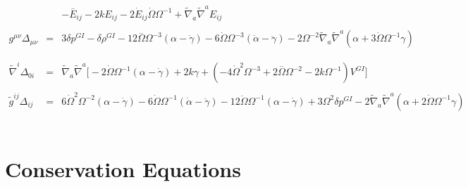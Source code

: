 \documentclass[10pt,letterpaper]{article}
\numberwithin{equation}{section}
\begin{document}
\begin{eqnarray}
\nonumber\\
&&- \overset{..}{E}_{ij} - 2 k E_{ij} - 2 \dot{E}_{ij} \dot{\Omega} \Omega^{-1} + \tilde{\nabla}_{a}\tilde{\nabla}^{a}E_{ij}
\\  \nonumber\\ 
g^{\mu\nu}\Delta_{\mu\nu}&=& 3 \delta p^{GI}{} -  \delta \rho^{GI}
-12 \overset{..}{\Omega}  \Omega^{-3}(\alpha - \dot\gamma) -6 \dot{\Omega} \Omega^{-3}(\dot{\alpha} -\ddot\gamma)
-2 \Omega^{-2} \tilde{\nabla}_{a}\tilde{\nabla}^{a}(\alpha +3\dot\Omega\Omega^{-1}\gamma)
\\ \nonumber\\
\nonumber\\ 
\tilde\nabla^i \Delta_{0i} &=& 
 \tilde\nabla_a\tilde\nabla^a\big[ -2 \dot{\Omega} \Omega^{-1} (\alpha - \dot\gamma) + 2 k \gamma 
+(-4 \dot{\Omega}^2 \Omega^{-3}  + 2 \overset{..}{\Omega} \Omega^{-2}  - 2 k \Omega^{-1}) V^{GI}\big]
\\ \nonumber\\
\tilde g^{ij}\Delta_{ij} &=&  6 \dot{\Omega}^2 \Omega^{-2}(\alpha-\dot\gamma)
-6  \dot{\Omega} \Omega^{-1}(\dot\alpha -\ddot\gamma)-12\ddot\Omega\Omega^{-1}(\alpha-\dot\gamma)+ 3\Omega^2 \delta p^{GI}-2\tilde\nabla_a\tilde\nabla^a( \alpha + 2\dot\Omega \Omega^{-1}\gamma)
\end{eqnarray}
%
\\ \newpage
\section{Conservation Equations}
\end{document}
